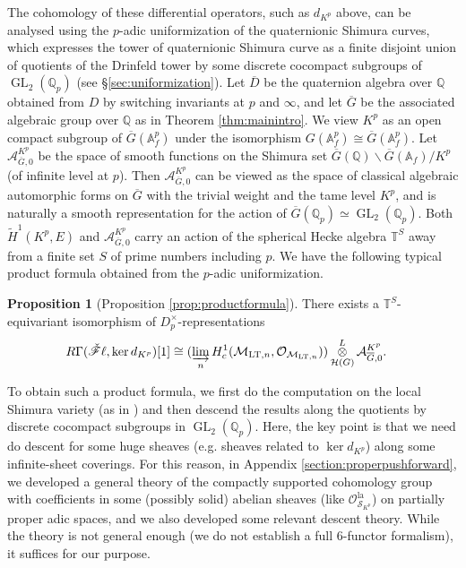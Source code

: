 \documentclass{article}
\theoremstyle{definition}
\newtheorem{proposition}[theorem]{Proposition}
\def\calA{\mathcal{A}}
\def\calH{\mathcal{H}}
\def\calM{\mathcal{M}}
\def\calO{\mathcal{O}}
\def\calS{\mathcal{S}}
\def\bbA{\mathbb{A}}
\def\bbQ{\mathbb{Q}}
\def\bbT{\mathbb{T}}
\def\bs{\backslash}
\DeclareMathOperator{\ox}{\otimes}
\def\isom{\cong}
\newcommand{\dlim}{\varinjlim}
\DeclareMathOperator{\GL}{GL}
\def\LT{\mathrm{LT}}
\def\lan{\mathrm{la}}
\def\bar{\overline}
\def\tilde{\widetilde}
\def\fl{\mathscr{F}\ell}
\begin{document}
The cohomology of these differential operators, such as $d_{K^p}$ above, can be analysed using the $p$-adic uniformization of the quaternionic Shimura curves, which expresses the tower of quaternionic Shimura curve as a finite disjoint union of quotients of the Drinfeld tower by some discrete cocompact subgroups of $\GL_2(\bbQ_p)$ (see \S\ref{sec:uniformization}). Let $\bar D$ be the quaternion algebra over $\bbQ$ obtained from $D$ by switching invariants at $p$ and $\infty$, and let $\bar G$ be the associated algebraic group over $\bbQ$ as in Theorem \ref{thm:mainintro}. We view $K^p$ as an open compact subgroup of $\bar G(\bbA_f^p)$ under the isomorphism $G(\bbA_f^p)\isom \bar G(\bbA_f^p)$. Let $\calA^{K^p}_{\bar G,0}$ be the space of smooth functions on the Shimura set $\bar G(\bbQ)\bs\bar G(\bbA_f)/K^p$ (of infinite level at $p$). Then $\calA^{K^p}_{\bar G,0}$ can be viewed as the space of classical algebraic automorphic forms on $\bar G$ with the trivial weight and the tame level $K^p$, and is naturally a smooth representation for the action of $\bar G(\bbQ_p)\simeq \GL_2(\bbQ_p)$. Both $\tilde{H}^1(K^p,E)$ and $\calA_{\bar G,0}^{K^p}$ carry an action of the spherical Hecke algebra $\bbT^S$ away from a finite set $S$ of prime numbers including $p$. We have the following typical product formula obtained from the $p$-adic uniformization. 
\begin{proposition}[Proposition \ref{prop:productformula}]\label{introproductformula}
    There exists a $\bbT^S$-equivariant isomorphism of $D_p^{\times}$-representations
    \begin{align*}
        R\Gamma(\check{\fl},\ker d_{K^p})[1]&\isom (\dlim_nH^1_c(\calM_{\LT,n},\calO_{\calM_{\LT,n}}))\ox_{\calH(G)}^L\calA^{K^p}_{\bar G,0}.
    \end{align*}
\end{proposition}
To obtain such a product formula, we first do the computation on the local Shimura variety (as in \cite[\S 5.2, 5.3]{PanII}) and then descend the results along the quotients by discrete cocompact subgroups in $\GL_2(\bbQ_p)$. Here, the key point is that we need do descent for some huge sheaves (e.g. sheaves related to $\ker d_{K^p}$) along some infinite-sheet coverings. For this reason, in Appendix \ref{section:properpushforward}, we developed a general theory of the compactly supported cohomology group with coefficients in some (possibly solid) abelian sheaves (like $\calO_{\calS_{K^p}}^{\lan}$) on partially proper adic spaces, and we also developed some relevant descent theory. While the theory is not general enough (we do not establish a full $6$-functor formalism), it suffices for our purpose.
\end{document}
